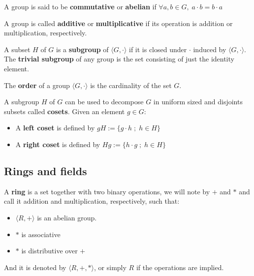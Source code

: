 \documentclass[a4paper,12pt]{article}
\begin{document}
\begin{definition}
  A group is said to be \textbf{commutative} or \textbf{abelian}
  if $\forall a, b \in G, \; a\cdot b = b\cdot a$
\end{definition}

\noindent
A group is called \textbf{additive} or \textbf{multiplicative} if its
operation is addition or multiplication, respectively.

\begin{definition}
  A subset $H$ of $G$ is a \textbf{subgroup} of $\langle G,\cdot \rangle$ if it is
  closed under $\cdot$ induced by $\langle G,\cdot \rangle$. The \textbf{trivial subgroup} of any
  group is the set consisting of just the identity element.
\end{definition}

\begin{definition}
  The \textbf{order} of a group $\langle G,\cdot\rangle$ is the cardinality of the set $G$.
\end{definition}

\begin{definition}
  A subgroup $H$ of $G$ can be used to decompose $G$ in uniform sized and
  disjoints subsets called \textbf{cosets}. Given an element $g \in G$:
  \begin{itemize}
  \item A \textbf{left coset} is defined by $gH := \{g\cdot h \; ; \; h \in H\}$
  \item A \textbf{right coset} is defined by $Hg := \{h\cdot g \; ; \; h \in H\}$
  \end{itemize}
\end{definition}

\subsection{Rings and fields}
\label{sec:org29a817c}

   \begin{definition}
  A \textbf{ring} is a set together with two binary operations, we will note by
  $+$ and $*$ and call it addition and multiplication, respectively, such that:
  \begin{itemize}
  \item $\langle R,+\rangle$ is an abelian group.
  \item $*$ is associative
  \item $*$ is distributive over $+$
  \end{itemize}

  And it is denoted by $\langle R,+,*\rangle$, or simply $R$ if the operations are implied.
\end{definition}
\end{document}
